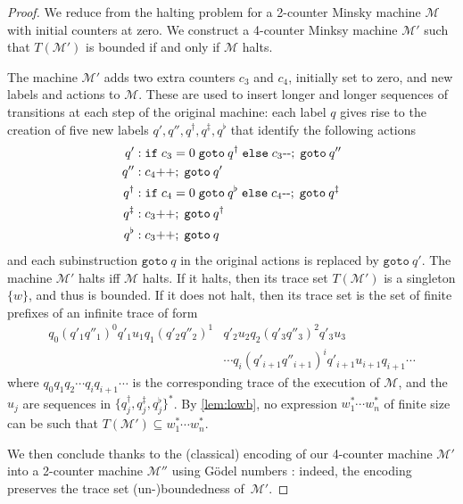 \documentclass[11pt,reqno,a4paper]{amsart}
\theoremstyle{plain}
\theoremstyle{definition}
\theoremstyle{remark}
\begin{document}
\begin{proof}
  We reduce from the halting problem for a 2-counter Minsky machine
  $\mathcal{M}$ with initial counters at zero.  We construct a 4-counter
  Minksy machine $\mathcal{M}'$ such that $T(\mathcal{M}')$ is bounded
  if and only if $\mathcal{M}$ halts. 

  The machine $\mathcal{M}'$ adds two extra counters $c_3$ and $c_4$,
  initially set to zero, and new labels and actions to $\mathcal{M}$.
  These are used to insert longer and longer sequences of transitions at each
  step of the original machine: each label $q$ gives rise to the
  creation of five new labels $q',q'',q^\dagger,q^\ddagger,q^\flat$ that
  identify the following actions
  \begin{align*}
    q':&\;\mathtt{if}\;c_3=0\;\mathtt{goto}\:q^\dagger\;\mathtt{else}\;c_3\text-\text-;\;\mathtt{goto}\:q''\\
    q'':&\;c_4\text{++};\;\mathtt{goto}\:q'\\
    q^\dagger:&\;\mathtt{if}\;c_4=0\;\mathtt{goto}\:q^\flat\;\mathtt{else}\;c_4\text-\text-;\;\mathtt{goto}\:q^\ddagger\\
    q^\ddagger:&\;c_3\text{++};\;\mathtt{goto}\:q^\dagger\\
    q^\flat:&\;c_3\text{++};\;\mathtt{goto}\:q
  \end{align*}
  and each subinstruction $\mathtt{goto}\:q$ in the original actions is
  replaced by $\mathtt{goto}\:q'$.  The machine
  $\mathcal{M'}$ halts iff $\mathcal{M}$ halts.  If it 
  halts, then its trace set $T(\mathcal{M}')$ is a singleton $\{w\}$, and
  thus is bounded.  If it does not halt, then its trace set is the set of
  finite prefixes of an infinite trace of form
  \begin{align*}
    q_0(q'_1q''_1)^0q'_1u_1q_1(q'_2q''_2)^1&q'_2u_2q_2(q'_3q''_3)^2q'_3u_3\\&\cdots
    q_i(q'_{i+1}q''_{i+1})^iq'_{i+1}u_{i+1}q_{i+1}\cdots
  \end{align*}
  where $q_0q_1q_2\cdots q_iq_{i+1}\cdots$ is the corresponding trace of
  the execution of $\mathcal{M}$, and the $u_j$ are sequences in
  $\{q_j^\dagger,q_j^\ddagger,q_j^\flat\}^\ast$.  By
  \autoref{lem:lowb}, no expression $w_1^\ast\cdots w_n^\ast$ of
  finite size can be such that $T(\mathcal{M}')\subseteq w_1^\ast\cdots
  w_n^\ast$. 

  We then conclude thanks to the (classical) encoding of our 4-counter
  machine $\mathcal{M}'$ into a 2-counter machine $\mathcal{M}''$ using
  G\"odel numbers \citep{minsky}: indeed, the encoding preserves the
  trace set (un-)boundedness of~$\mathcal{M}'$.
\end{proof}
\end{document}
